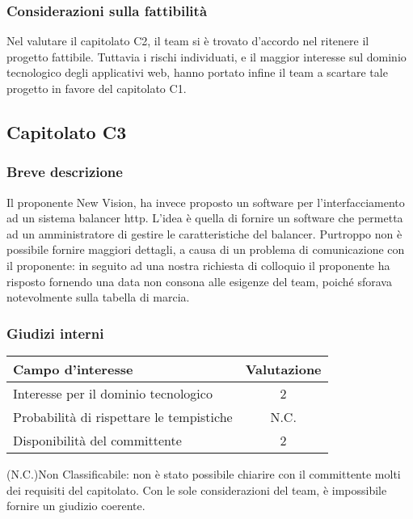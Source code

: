 \subsubsection{Considerazioni sulla fattibilità}
Nel valutare il capitolato C2, il team si è trovato d'accordo nel ritenere il progetto fattibile. Tuttavia i rischi individuati, e il maggior interesse sul dominio tecnologico degli applicativi web, hanno portato infine il team a scartare tale progetto in favore del capitolato C1.

\subsection{Capitolato C3}
\subsubsection{Breve descrizione}
Il proponente New Vision, ha invece proposto un software per l'interfacciamento ad un sistema balancer http. L'idea è quella di fornire un software che permetta ad un amministratore di gestire le caratteristiche del balancer. Purtroppo non è possibile fornire maggiori dettagli, a causa di un problema di comunicazione con il proponente: in seguito ad una nostra richiesta di colloquio il proponente ha risposto fornendo una data non consona alle esigenze del team, poiché sforava notevolmente sulla tabella di marcia.
\subsubsection{Giudizi interni}
\begin{center}
\begin{tabular}{lc}
\toprule
Campo d'interesse & Valutazione\\
\midrule %
Interesse per il dominio tecnologico & 2\\
Probabilità di rispettare le tempistiche & N.C.\\
Disponibilità del committente & 2\\
\bottomrule
\end{tabular}
\end{center}
(N.C.)Non Classificabile: non è stato possibile chiarire con il committente molti dei requisiti del capitolato. Con le sole considerazioni del team, è impossibile fornire un giudizio coerente.

